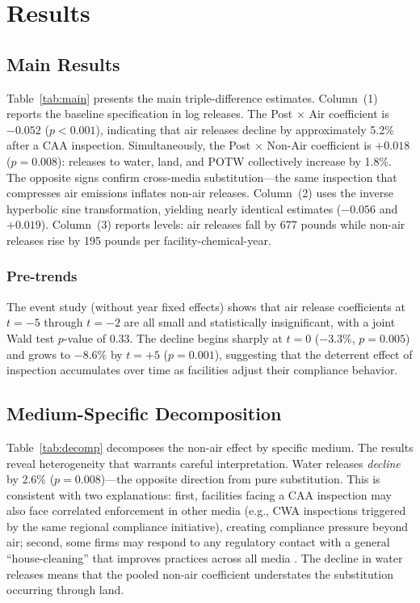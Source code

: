 \documentclass[12pt]{article}
\begin{document}
\section{Results}

\subsection{Main Results}



Table~\ref{tab:main} presents the main triple-difference estimates. Column~(1) reports the baseline specification in log releases. The Post $\times$ Air coefficient is $-0.052$ ($p < 0.001$), indicating that air releases decline by approximately 5.2\% after a CAA inspection. Simultaneously, the Post $\times$ Non-Air coefficient is $+0.018$ ($p = 0.008$): releases to water, land, and POTW collectively increase by 1.8\%. The opposite signs confirm cross-media substitution---the same inspection that compresses air emissions inflates non-air releases. Column~(2) uses the inverse hyperbolic sine transformation, yielding nearly identical estimates ($-0.056$ and $+0.019$). Column~(3) reports levels: air releases fall by 677 pounds while non-air releases rise by 195 pounds per facility-chemical-year.

\subsubsection*{Pre-trends} The event study (without year fixed effects) shows that air release coefficients at $t = -5$ through $t = -2$ are all small and statistically insignificant, with a joint Wald test $p$-value of 0.33. The decline begins sharply at $t = 0$ ($-3.3\%$, $p = 0.005$) and grows to $-8.6\%$ by $t = +5$ ($p = 0.001$), suggesting that the deterrent effect of inspection accumulates over time as facilities adjust their compliance behavior.

\subsection{Medium-Specific Decomposition}



Table~\ref{tab:decomp} decomposes the non-air effect by specific medium. The results reveal heterogeneity that warrants careful interpretation. Water releases \textit{decline} by 2.6\% ($p = 0.008$)---the opposite direction from pure substitution. This is consistent with two explanations: first, facilities facing a CAA inspection may also face correlated enforcement in other media (e.g., CWA inspections triggered by the same regional compliance initiative), creating compliance pressure beyond air; second, some firms may respond to any regulatory contact with a general ``house-cleaning'' that improves practices across all media \citep{gunningham2003shades}. The decline in water releases means that the pooled non-air coefficient understates the substitution occurring through land.
\end{document}
